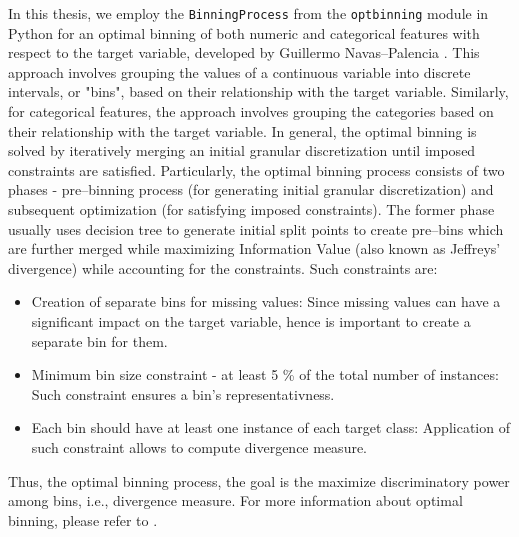 In this thesis, we employ the \lstinline{BinningProcess} from the \lstinline{optbinning} module in Python for an optimal binning of both numeric and categorical features with respect to the target variable, developed by Guillermo Navas--Palencia \citep{navas2020optimal}. 
This approach involves grouping the values of a continuous variable into discrete intervals, or "bins", based on their relationship with the target variable.
Similarly, for categorical features, the approach involves grouping the categories based on their relationship with the target variable.
In general, the optimal binning is solved by iteratively merging an initial granular discretization until imposed constraints are satisfied. Particularly, the optimal binning process consists of two phases - pre--binning process (for generating initial granular discretization) and subsequent optimization (for satisfying imposed constraints).
The former phase usually uses decision tree to generate initial split points to create pre--bins which are further merged while maximizing Information Value (also known as Jeffreys' divergence) while accounting for the constraints. \citep{navas2020optimal} Such constraints are:
\begin{itemize}\setlength\itemsep{0em} 
    \item Creation of separate bins for missing values: Since missing values can have a significant impact on the target variable, hence is important to create a separate bin for them.
    \item Minimum bin size constraint - at least 5 \% of the total number of instances: Such constraint ensures a bin's representativness.
    \item Each bin should have at least one instance of each target class: Application of such constraint allows to compute divergence measure.
\end{itemize}
Thus, the optimal binning process, the goal is the maximize discriminatory power among bins, i.e., divergence measure.
For more information about optimal binning, please refer to \citep{navas2020optimal}.

